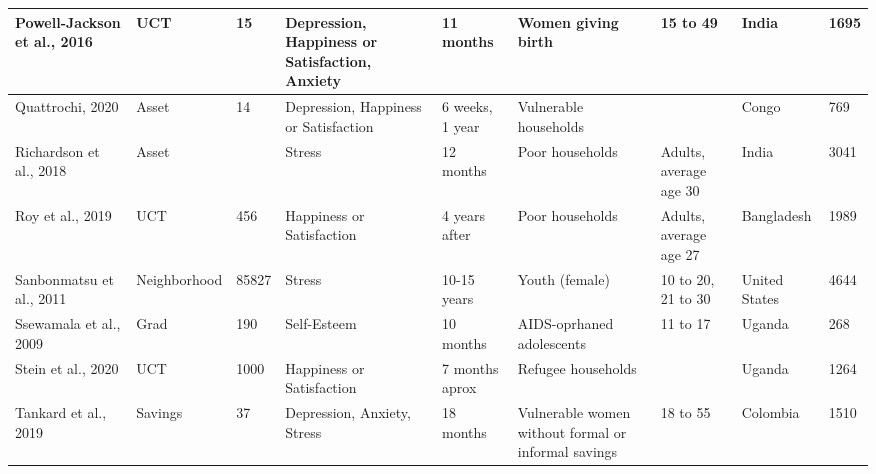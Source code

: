 \begin{longtable}{p{1.8cm}p{1.7cm}p{1.3 cm}p{1.8cm}p{1.7cm}p{1.8cm}p{1cm}p{1.2cm}p{1cm}}
   \hline
Powell-Jackson et al., 2016 & UCT & 15 & Depression, Happiness or Satisfaction, Anxiety & 11 months & Women giving birth & 15 to 49 & India & 1695 \\ 
   \hline
Quattrochi, 2020 & Asset & 14 & Depression, Happiness or Satisfaction & 6 weeks, 1 year & Vulnerable households &  & Congo & 769 \\ 
   \hline
Richardson et al., 2018 & Asset &  & Stress & 12 months & Poor households & Adults, average age 30 & India & 3041 \\ 
   \hline
Roy et al., 2019 & UCT & 456 & Happiness or Satisfaction & 4 years after & Poor households & Adults, average age 27 & Bangladesh & 1989 \\ 
   \hline
Sanbonmatsu et al., 2011 & Neighborhood & 85827 & Stress & 10-15 years & Youth (female) & 10 to 20, 21 to 30 & United States & 4644 \\ 
   \hline
Ssewamala et al., 2009 & Grad & 190 & Self-Esteem & 10 months & AIDS-oprhaned adolescents & 11 to 17 & Uganda & 268 \\ 
   \hline
Stein et al., 2020 & UCT & 1000 & Happiness or Satisfaction & 7 months aprox & Refugee households &  & Uganda & 1264 \\ 
   \hline
Tankard et al., 2019 & Savings & 37 & Depression, Anxiety, Stress & 18 months & Vulnerable women without formal or informal savings & 18 to 55 & Colombia & 1510 \\ 
   \hline
\hline
\end{longtable}
\endgroup
